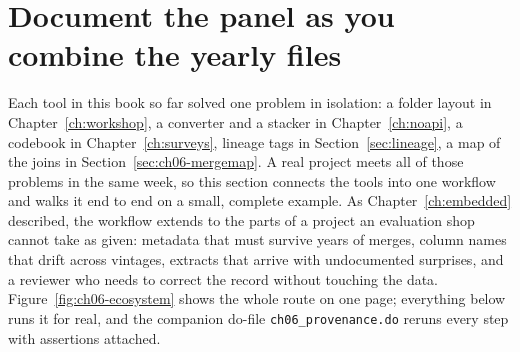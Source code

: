 \section{Document the panel as you combine the yearly files}\label{sec:ch06-ecosystem}
Each tool in this book so far solved one problem in isolation: a folder layout in Chapter~\ref{ch:workshop}, a converter and a stacker in Chapter~\ref{ch:noapi}, a codebook in Chapter~\ref{ch:surveys}, lineage tags in Section~\ref{sec:lineage}, a map of the joins in Section~\ref{sec:ch06-mergemap}. A real project meets all of those problems in the same week, so this section connects the tools into one workflow and walks it end to end on a small, complete example. As Chapter~\ref{ch:embedded} described, the workflow extends \textcite{long2009workflow} to the parts of a project an evaluation shop cannot take as given: metadata that must survive years of merges, column names that drift across vintages, extracts that arrive with undocumented surprises, and a reviewer who needs to correct the record without touching the data. Figure~\ref{fig:ch06-ecosystem} shows the whole route on one page; everything below runs it for real, and the companion do-file \texttt{ch06\_provenance.do} reruns every step with assertions attached.

